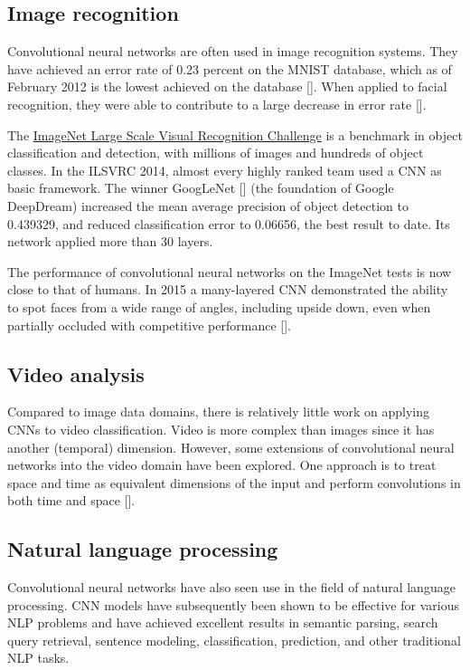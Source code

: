 \subsection{Image recognition}

Convolutional neural networks are often used in image recognition systems. They have achieved an error rate of 0.23 percent on the MNIST database, which as of February 2012 is the lowest achieved on the database [\cite{6248110}]. When applied to facial recognition, they were able to contribute to a large decrease in error rate [\cite{554195}].

The \href{http://www.image-net.org/challenges/LSVRC/}{ImageNet Large Scale Visual Recognition Challenge} is a benchmark in object classification and detection, with millions of images and hundreds of object classes. In the ILSVRC 2014, almost every highly ranked team used a \ac{CNN} as basic framework. The winner GoogLeNet [\cite{DBLP:journals/corr/SzegedyLJSRAEVR14}] (the foundation of Google DeepDream) increased the mean average precision of object detection to 0.439329, and reduced classification error to 0.06656, the best result to date. Its network applied more than 30 layers.

The performance of convolutional neural networks on the ImageNet tests is now close to that of humans. In 2015 a many-layered CNN demonstrated the ability to spot faces from a wide range of angles, including upside down, even when partially occluded with competitive performance [\cite{DBLP:journals/corr/FarfadeSL15}].

\subsection{Video analysis}

Compared to image data domains, there is relatively little work on applying \acp{CNN} to video classification. Video is more complex than images since it has another (temporal) dimension. However, some extensions of convolutional neural networks into the video domain have been explored. One approach is to treat space and time as equivalent dimensions of the input and perform convolutions in both time and space [\cite{6165309}].

\subsection{Natural language processing}

Convolutional neural networks have also seen use in the field of natural language processing. \ac{CNN} models have subsequently been shown to be effective for various \acs{NLP} problems and have achieved excellent results in semantic parsing, search query retrieval, sentence modeling, classification, prediction, and other traditional \acs{NLP} tasks.

